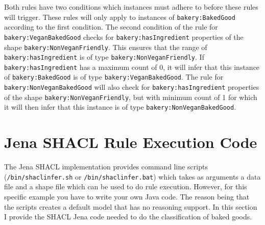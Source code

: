 \documentclass{amsart}
\begin{document}
  Both rules have two conditions which instances must adhere to before these rules will trigger. These rules will only apply to instances of \texttt{bakery:BakedGood} according to the first condition. The second condition of the rule for \texttt{bakery:VeganBakedGood} checks for \texttt{bakery:hasIngredient} properties of the shape \texttt{bakery:NonVeganFriendly}. This ensures that the range of \texttt{bakery:hasIngredient} is of type \texttt{bakery:NonVeganFriendly}. If \texttt{bakery:hasIngredient} has a maximum count of 0, it will infer that this instance of \texttt{bakery:BakedGood} is of type \texttt{bakery:VeganBakedGood}. The rule for \texttt{bakery:NonVeganBakedGood} will also check for \texttt{bakery:hasIngredient} properties of the shape \texttt{bakery:NonVeganFriendly}, but with minimum count of 1 for which it will then infer that this instance is of type \texttt{bakery:NonVeganBakedGood}. 
  
  \section{Jena SHACL Rule Execution Code}
  The Jena SHACL implementation provides command line scripts (\texttt{/bin/shaclinfer.sh} or \texttt{/bin/shaclinfer.bat}) which takes as arguments a data file and a shape file which can be used to do rule execution. However, for this specific example you have to write your own Java code. The reason being that the scripts creates a default model that has no reasoning support. In this section I provide the SHACL Jena code needed to do the classification of baked goods.
\end{document}
